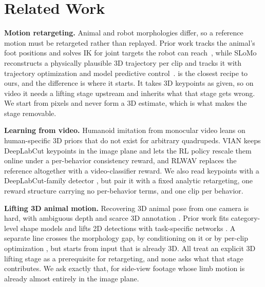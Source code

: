 \documentclass[letterpaper, 10 pt, conference]{ieeeconf}
\begin{document}
\section{Related Work}
\label{sec:related_work}

\noindent
\textbf{Motion retargeting.}
Animal and robot morphologies differ, so a reference motion must be retargeted rather than replayed. Prior work tracks the animal's foot positions and solves IK for joint targets the robot can reach~\cite{peng2020learning}, while SLoMo reconstructs a physically plausible 3D trajectory per clip and tracks it with trajectory optimization and model predictive control~\cite{zhang2023slomo}. 
\cite{peng2020learning} is the closest recipe to ours, and the difference is where it starts. It takes 3D keypoints as given, so on video it needs a lifting stage upstream and inherits what that stage gets wrong. We start from pixels and never form a 3D estimate, which is what makes the stage removable. 



\textbf{Learning from video.} Humanoid imitation from monocular video leans on human-specific 3D priors \cite{videomimic,he2025asapaligningsimulationrealworld} that do not exist for arbitrary quadrupeds. VIAN \cite{yao2022imitation} keeps DeepLabCut \cite{mathis2018deeplabcut} keypoints in the image plane and lets the RL policy rescale them online under a per-behavior consistency reward, and RLWAV \cite{chane2024reinforcement} replaces the reference altogether with a video-classifier reward. We also read keypoints with a DeepLabCut-family detector \cite{ye2024superanimal}, but pair it with a fixed analytic retargeting, one reward structure carrying no per-behavior terms, and one clip per behavior.

\textbf{Lifting 3D animal motion.} Recovering 3D animal pose from one camera is hard, with ambiguous depth and scarce 3D annotation \cite{joska2021acinoset}. Prior work fits category-level shape models \cite{rueegg2023bite} and lifts 2D detections with task-specific networks \cite{zhao2025learning}. A separate line crosses the morphology gap, by conditioning on it \cite{danesh2026toward} or by per-clip optimization \cite{yoon2024stmr}, but starts from input that is already 3D. All treat an explicit 3D lifting stage as a prerequisite for retargeting, and none asks what that stage contributes. We ask exactly that, for side-view footage whose limb motion is already almost entirely in the image plane.
\end{document}

